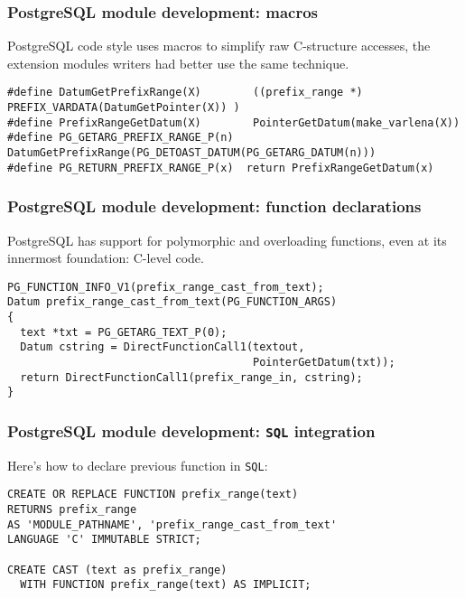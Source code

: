 \documentclass{beamer}
\begin{document}
\begin{frame}[fragile]
  \frametitle{PostgreSQL module development: macros}

  PostgreSQL code style uses macros to simplify raw C-structure accesses,
  the extension modules writers had better use the same technique.

  \begin{example}
  \begin{verbatim}
#define DatumGetPrefixRange(X)	      ((prefix_range *) PREFIX_VARDATA(DatumGetPointer(X)) )
#define PrefixRangeGetDatum(X)	      PointerGetDatum(make_varlena(X))
#define PG_GETARG_PREFIX_RANGE_P(n)  DatumGetPrefixRange(PG_DETOAST_DATUM(PG_GETARG_DATUM(n)))
#define PG_RETURN_PREFIX_RANGE_P(x)  return PrefixRangeGetDatum(x)
  \end{verbatim}
  \end{example}
\end{frame}


\begin{frame}[fragile]
  \frametitle{PostgreSQL module development: function declarations}

  PostgreSQL has support for polymorphic and overloading functions, even at
  its innermost foundation: C-level code.

  \begin{example}
  \begin{verbatim}
PG_FUNCTION_INFO_V1(prefix_range_cast_from_text);
Datum prefix_range_cast_from_text(PG_FUNCTION_ARGS)
{
  text *txt = PG_GETARG_TEXT_P(0);
  Datum cstring = DirectFunctionCall1(textout, 
                                      PointerGetDatum(txt));
  return DirectFunctionCall1(prefix_range_in, cstring);
}
  \end{verbatim}
  \end{example}
\end{frame}

\begin{frame}[fragile]
  \frametitle{PostgreSQL module development: \texttt{SQL} integration}

  Here's how to declare previous function in \texttt{SQL}:

  \begin{example}
  \begin{verbatim}
CREATE OR REPLACE FUNCTION prefix_range(text)
RETURNS prefix_range
AS 'MODULE_PATHNAME', 'prefix_range_cast_from_text'
LANGUAGE 'C' IMMUTABLE STRICT;

CREATE CAST (text as prefix_range)
  WITH FUNCTION prefix_range(text) AS IMPLICIT;
  \end{verbatim}
  \end{example}
\end{frame}
\end{document}

